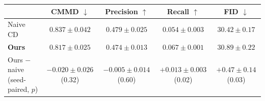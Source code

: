 \begin{tabular}{l c c c c}
\toprule
 & CMMD $\downarrow$ & Precision $\uparrow$ & Recall $\uparrow$ & FID $\downarrow$ \\
\midrule
Naive CD & $0.837\pm0.042$ & $0.479\pm0.025$ & $0.054\pm0.003$ & $30.42\pm0.17$ \\
\textbf{Ours} & $0.817\pm0.025$ & $0.474\pm0.013$ & $0.067\pm0.001$ & $30.89\pm0.22$ \\
\midrule
Ours $-$ naive (seed-paired, $p$) & $-0.020\pm0.026$ (0.32) & $-0.005\pm0.014$ (0.60) & $+0.013\pm0.003$ (0.02) & $+0.47\pm0.14$ (0.03) \\
\bottomrule
\end{tabular}